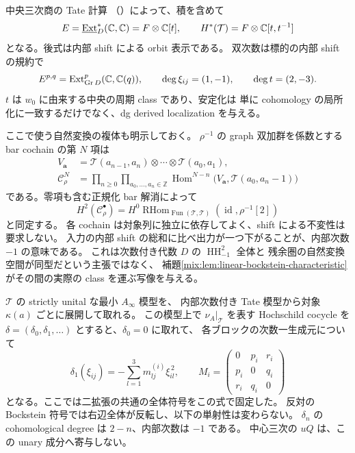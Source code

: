中央三次商の Tate 計算
（）によって、積を含めて
\begin{equation}\label{mix:eq:linear-bockstein-tate}
 E=\underline{\operatorname{Ext}}_D^*(\mathbb C,\mathbb C)
        =F\otimes\mathbb C[t],\qquad
 H^*(\mathcal T)=F\otimes\mathbb C[t,t^{-1}]
\end{equation}
となる。後式は内部 shift による orbit 表示である。
双次数は標的の内部 shift の規約で
\[
 E^{p,q}=\operatorname{Ext}^p_{\operatorname{Gr}D}(\mathbb C,\mathbb C(q)),\qquad
 \deg\xi_{ij}=(1,-1),\qquad \deg t=(2,-3).
\]
$t$ は $w_0$ に由来する中央の周期 class であり、安定化は
単に cohomology の局所化に一致するだけでなく、dg derived localization を与える。

ここで使う自然変換の複体も明示しておく。
$\rho^{-1}$ の graph 双加群を係数とする bar cochain の第 $N$ 項は
\[
 \begin{aligned}
 V_{\boldsymbol a}
   &=\mathcal T(a_{n-1},a_n)\otimes\cdots\otimes\mathcal T(a_0,a_1),\\
 \mathcal C_\rho^N
   &=\prod_{n\ge0}\prod_{a_0,\ldots,a_n\in\mathbb Z}
      \operatorname{Hom}^{N-n}
       \bigl(V_{\boldsymbol a},\mathcal T(a_0,a_n-1)\bigr)
 \end{aligned}
\]
である。零項も含む正規化 bar 解消によって
\[
 H^2(\mathcal C_\rho^\bullet)=
 H^0\operatorname{RHom}_{\operatorname{Fun}(\mathcal T,\mathcal T)}
       (\operatorname{id},\rho^{-1}[2])
\]
と同定する。
各 cochain は対象列に独立に依存してよく、shift による不変性は要求しない。
入力の内部 shift の総和に比べ出力が一つ下がることが、内部次数 $-1$ の意味である。
これは次数付き代数 $D$ の $\operatorname{HH}^2_{-1}$ 全体と
残余圏の自然変換空間が同型だという主張ではなく、
補題\ref{mix:lem:linear-bockstein-characteristic}がその間の実際の class を運ぶ写像を与える。

\begin{lemma}
\label{mix:lem:linear-bockstein-unary}
$\mathcal T$ の strictly unital な最小 $A_\infty$ 模型を、
内部次数付き Tate 模型から対象 $\kappa(a)$ ごとに展開して取れる。
この模型上で $\nu_A|_{\mathcal T}$ を表す Hochschild cocycle を
$\delta=(\delta_0,\delta_1,\ldots)$ とすると、$\delta_0=0$ に取れて、
各ブロックの次数一生成元について
\begin{equation}\label{mix:eq:linear-bockstein-unary}
 \delta_1(\xi_{ij})=-\sum_{l=1}^3m^{(i)}_{lj}\xi_{il}^{\,2},
 \qquad
 M_i=\begin{pmatrix}0&p_i&r_i\\p_i&0&q_i\\r_i&q_i&0\end{pmatrix}
\end{equation}
となる。ここでは二拡張の共通の全体符号をこの式で固定した。
反対の Bockstein 符号では右辺全体が反転し、以下の単射性は変わらない。
$\delta_n$ の cohomological degree は $2-n$、内部次数は $-1$ である。
中心三次の $uQ$ は、この unary 成分へ寄与しない。
\end{lemma}


